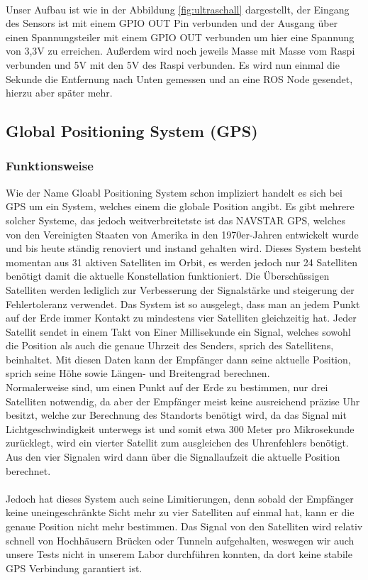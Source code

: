 \\
Unser Aufbau ist wie in der Abbildung \ref{fig:ultraschall} dargestellt, der Eingang des Sensors ist mit einem GPIO OUT Pin verbunden und der Ausgang über einen Spannungsteiler mit einem GPIO OUT verbunden um hier eine Spannung von 3,3V zu erreichen. Außerdem wird noch jeweils Masse mit Masse vom Raspi verbunden und 5V mit den 5V des Raspi verbunden. Es wird nun einmal die Sekunde die Entfernung nach Unten gemessen und an eine ROS Node gesendet, hierzu aber später mehr.
\\


\subsection{Global Positioning System (GPS)}
\subsubsection{Funktionsweise}
Wie der Name Gloabl Positioning System schon impliziert handelt es sich bei GPS um ein System, welches einem die globale Position angibt. Es gibt mehrere solcher Systeme, das jedoch weitverbreitetste ist das NAVSTAR GPS, welches von den Vereinigten Staaten von Amerika in den 1970er-Jahren entwickelt wurde und bis heute ständig renoviert und instand gehalten wird. Dieses System besteht momentan aus 31 aktiven Satelliten im Orbit, es werden jedoch nur 24 Satelliten benötigt damit die aktuelle Konstellation funktioniert. Die Überschüssigen Satelliten werden lediglich zur Verbesserung der Signalstärke und steigerung der Fehlertoleranz verwendet. Das System ist so ausgelegt, dass man an jedem Punkt auf der Erde immer Kontakt zu mindestens vier Satelliten gleichzeitig hat. Jeder Satellit sendet in einem Takt von Einer Millisekunde ein Signal, welches sowohl die Position als auch die genaue Uhrzeit des Senders, sprich des Satellitens, beinhaltet. Mit diesen Daten kann der Empfänger dann seine aktuelle Position, sprich seine Höhe sowie Längen- und Breitengrad berechnen.\\ Normalerweise sind, um einen Punkt auf der Erde zu bestimmen, nur drei Satelliten notwendig, da aber der Empfänger meist keine ausreichend präzise Uhr besitzt, welche zur Berechnung des Standorts benötigt wird, da das Signal mit Lichtgeschwindigkeit unterwegs ist und somit etwa 300 Meter pro Mikrosekunde zurücklegt, wird ein vierter Satellit zum ausgleichen des Uhrenfehlers benötigt. Aus den vier Signalen wird dann über die Signallaufzeit die aktuelle Position berechnet.
\\
\\
Jedoch hat dieses System auch seine Limitierungen, denn sobald der Empfänger keine uneingeschränkte Sicht mehr zu vier Satelliten auf einmal hat, kann er die genaue Position nicht mehr bestimmen. Das Signal von den Satelliten wird relativ schnell von Hochhäusern Brücken oder Tunneln aufgehalten, weswegen wir auch unsere Tests nicht in unserem Labor durchführen konnten, da dort keine stabile GPS Verbindung garantiert ist.

